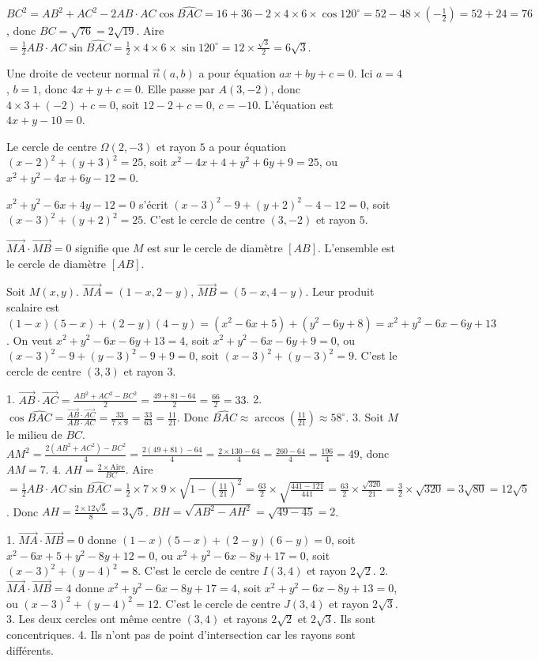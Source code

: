 $BC^2=AB^2+AC^2-2AB\cdot AC\cos\widehat{BAC}=16+36-2\times4\times6\times\cos120^\circ=52-48\times\left(-\frac12\right)=52+24=76$, donc $BC=\sqrt{76}=2\sqrt{19}$.
Aire $=\frac12 AB\cdot AC\sin\widehat{BAC}=\frac12\times4\times6\times\sin120^\circ=12\times\frac{\sqrt3}{2}=6\sqrt3$.

Une droite de vecteur normal $\vec{n}(a,b)$ a pour équation $ax+by+c=0$. Ici $a=4$, $b=1$, donc $4x+y+c=0$. Elle passe par $A(3,-2)$, donc $4\times3+(-2)+c=0$, soit $12-2+c=0$, $c=-10$. L'équation est $4x+y-10=0$.

Le cercle de centre $\Omega(2,-3)$ et rayon $5$ a pour équation $(x-2)^2+(y+3)^2=25$, soit $x^2-4x+4+y^2+6y+9=25$, ou $x^2+y^2-4x+6y-12=0$.

$x^2+y^2-6x+4y-12=0$ s'écrit $(x-3)^2-9+(y+2)^2-4-12=0$, soit $(x-3)^2+(y+2)^2=25$. C'est le cercle de centre $(3,-2)$ et rayon $5$.

$\overrightarrow{MA}\cdot\overrightarrow{MB}=0$ signifie que $M$ est sur le cercle de diamètre $[AB]$. L'ensemble est le cercle de diamètre $[AB]$.

Soit $M(x,y)$. $\overrightarrow{MA}=(1-x,2-y)$, $\overrightarrow{MB}=(5-x,4-y)$. Leur produit scalaire est $(1-x)(5-x)+(2-y)(4-y)= (x^2-6x+5)+(y^2-6y+8)=x^2+y^2-6x-6y+13$. On veut $x^2+y^2-6x-6y+13=4$, soit $x^2+y^2-6x-6y+9=0$, ou $(x-3)^2-9+(y-3)^2-9+9=0$, soit $(x-3)^2+(y-3)^2=9$. C'est le cercle de centre $(3,3)$ et rayon $3$.

1. $\overrightarrow{AB}\cdot\overrightarrow{AC}=\frac{AB^2+AC^2-BC^2}{2}=\frac{49+81-64}{2}=\frac{66}{2}=33$.
2. $\cos\widehat{BAC}=\frac{\overrightarrow{AB}\cdot\overrightarrow{AC}}{AB\cdot AC}=\frac{33}{7\times9}=\frac{33}{63}=\frac{11}{21}$. Donc $\widehat{BAC}\approx\arccos\left(\frac{11}{21}\right)\approx58^\circ$.
3. Soit $M$ le milieu de $BC$. $AM^2=\frac{2(AB^2+AC^2)-BC^2}{4}=\frac{2(49+81)-64}{4}=\frac{2\times130-64}{4}=\frac{260-64}{4}=\frac{196}{4}=49$, donc $AM=7$.
4. $AH=\frac{2\times\text{Aire}}{BC}$. Aire $=\frac12 AB\cdot AC\sin\widehat{BAC}=\frac12\times7\times9\times\sqrt{1-\left(\frac{11}{21}\right)^2}=\frac{63}{2}\times\sqrt{\frac{441-121}{441}}=\frac{63}{2}\times\frac{\sqrt{320}}{21}=\frac{3}{2}\times\sqrt{320}=3\sqrt{80}=12\sqrt{5}$. Donc $AH=\frac{2\times12\sqrt5}{8}=3\sqrt5$. $BH=\sqrt{AB^2-AH^2}=\sqrt{49-45}=2$.

1. $\overrightarrow{MA}\cdot\overrightarrow{MB}=0$ donne $(1-x)(5-x)+(2-y)(6-y)=0$, soit $x^2-6x+5+y^2-8y+12=0$, ou $x^2+y^2-6x-8y+17=0$, soit $(x-3)^2+(y-4)^2=8$. C'est le cercle de centre $I(3,4)$ et rayon $2\sqrt2$.
2. $\overrightarrow{MA}\cdot\overrightarrow{MB}=4$ donne $x^2+y^2-6x-8y+17=4$, soit $x^2+y^2-6x-8y+13=0$, ou $(x-3)^2+(y-4)^2=12$. C'est le cercle de centre $J(3,4)$ et rayon $2\sqrt3$.
3. Les deux cercles ont même centre $(3,4)$ et rayons $2\sqrt2$ et $2\sqrt3$. Ils sont concentriques.
4. Ils n'ont pas de point d'intersection car les rayons sont différents.

